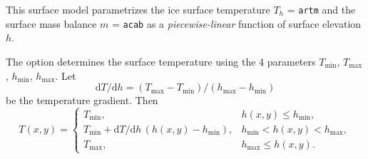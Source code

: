 \begin{itemize}
   This surface model parametrizes the ice surface temperature $T_{h}$ = \texttt{artm} and the surface mass balance $m$ = \texttt{acab} as a \emph{piecewise-linear} function of surface elevation $h$.

    The option  determines the surface temperature using the 4 parameters $T_{\mathrm{min}}$, $T_{\mathrm{max}}$, $h_{\mathrm{min}}$, $h_{\mathrm{max}}$. Let
    \begin{equation}
      \mathrm{d}T/\mathrm{d}h = (T_{\text{max}} - T_{\text{min}}) / (h_{\text{max}} - h_{\text{min}})
    \end{equation}
    be the temperature gradient.  Then
    \begin{equation}
      T(x,y) = \begin{cases}
        T_{\text{min}}, & h(x,y) \le h_{\text{min}}, \\
        T_{\text{min}} + \mathrm{d}T/\mathrm{d}h\,(h(x,y) - h_{\text{min}}),
        &  h_{\text{min}} < h(x,y) < h_{\text{max}}, \\
        T_{\text{max}}, & h_{\text{max}} \le h(x,y). \end{cases}
    \end{equation}
    

\end{itemize}
